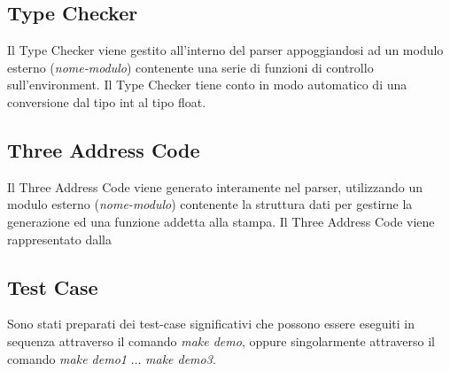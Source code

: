 \documentclass[12pt]{article}
\begin{document}
\subsection*{Type Checker}
Il Type Checker viene gestito all'interno del parser appoggiandosi ad un modulo esterno (\textit{nome-modulo}) contenente una serie di funzioni di controllo sull'environment. Il Type Checker tiene conto in modo automatico di una conversione dal tipo int al tipo float.

\subsection*{Three Address Code}
Il Three Address Code viene generato interamente nel parser, utilizzando un modulo esterno (\textit{nome-modulo}) contenente la struttura dati per gestirne la generazione ed una funzione addetta alla stampa.
Il Three Address Code viene rappresentato dalla 

\subsection*{Test Case}
Sono stati preparati dei test-case significativi che possono essere eseguiti in sequenza attraverso il comando \textit{make demo}, oppure singolarmente attraverso il comando \textit{make demo1} $\dots$ \textit{make demo3}.
\end{document}
